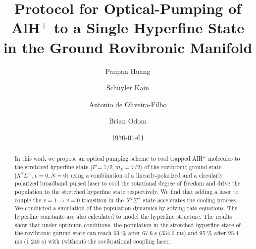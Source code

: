 \documentclass[nofootinbib,aip,jcp,reprint]{revtex4-1}
\begin{document}
\title{Protocol for Optical-Pumping of AlH$^+$ to a Single Hyperfine State in the Ground Rovibronic Manifold}

\author{Panpan Huang}

\author{Schuyler Kain}

\author{Antonio de Oliveira-Filho}

\author{Brian Odom}

\date{\today}

\begin{abstract}
In this work we propose an optical pumping scheme to cool trapped AlH$^+$ molecules to the stretched hyperfine state $\lvert F=7/2, m_F=7/2\rangle$ of the rovibronic ground state $\lvert X^2\Sigma^+, v=0, N=0\rangle$ using a combination of a linearly-polarized and a circularly polarized broadband pulsed laser to cool the rotational degree of freedom and drive the population to the stretched hyperfine state respectively. We find that adding a laser to couple the $v=1 \rightarrow v=0$ transition in the $ X^2\Sigma^+$ state accelerates the cooling process. We conducted a simulation of the population dynamics by solving rate equations. The hyperfine constants are also calculated to model the hyperfine structure. The results show that under optimum conditions, the population in the stretched hyperfine state of the rovibronic gorund state can reach 63 $\%$ after 67.6 {\micro}s (334.6 ms) and 95 $\%$ after 25.4 ms (1.240 s) with (without) the rovibrational coupling laser.
\end{abstract}

\maketitle
\end{document}
